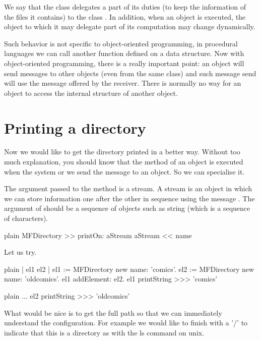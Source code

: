 \documentclass[10pt,twoside,english]{_support/latex/sbabook/sbabook}
\begin{document}
We say that the class  delegates a part of its duties (to keep the information of the files it contains) to the class . In addition, when an object is executed, the object to which it may delegate part of its computation may change dynamically. 

Such behavior is not specific to object-oriented programming, in procedural languages we can call another function defined on a data structure. 
Now with object-oriented programming, there is a really important point: an object will send messages to other objects (even from the same class) and such message send will use the message offered by the receiver. There is normally no way for an object to access the internal structure of another object.
\section{Printing a directory}
Now we would like to get the directory printed in a better way. Without too much explanation, you should know that the method  of an object is executed when the system or we send the message  to an object. So we can specialise it. 

The argument passed to the method  is a stream. A stream is an object in which we can store information one after the other in sequence using the message \textcode{\textless{}\textless{}}. The argument of \textcode{\textless{}\textless{}} should be a sequence of objects such as string (which is a sequence of characters).

\begin{displaycode}{plain}
MFDirectory >> printOn: aStream
	aStream << name
\end{displaycode}

Let us try. 

\begin{displaycode}{plain}
| el1 el2 |
el1 := MFDirectory new name: 'comics'.
el2 := MFDirectory new name: 'oldcomics'.
el1 addElement: el2.
el1 printString
>>> 'comics'
\end{displaycode}

\begin{displaycode}{plain}
	...
el2 printString
>>> 'oldcomics'
\end{displaycode}

What would be nice is to get the full path so that we can immediately understand the configuration.
For example we would like to  finish with a '/' to indicate that this is a directory as with the ls command on unix. 
\end{document}
